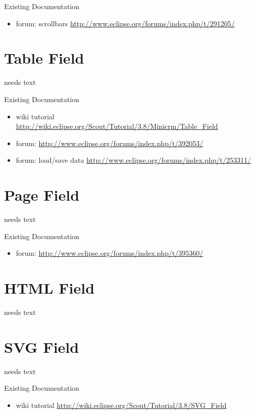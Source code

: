 \documentclass[a4paper,10pt,twoside]{book}
\begin{document}
\noindent Existing Documentation
\begin{itemize}
  \item forum: scrollbars \url{http://www.eclipse.org/forums/index.php/t/291205/}
\end{itemize}


\section{Table Field}
needs text

\noindent Existing Documentation
\begin{itemize}
  \item wiki tutorial \url{http://wiki.eclipse.org/Scout/Tutorial/3.8/Minicrm/Table_Field}
  \item forum: \url{http://www.eclipse.org/forums/index.php/t/392053/}
  \item forum: load/save data \url{http://www.eclipse.org/forums/index.php/t/253311/}
\end{itemize}

\section{Page Field}
needs text

\noindent Existing Documentation
\begin{itemize}
  \item forum: \url{http://www.eclipse.org/forums/index.php/t/395360/}
\end{itemize}

\section{HTML Field}
needs text

\section{SVG Field}
needs text

\noindent Existing Documentation
\begin{itemize}
  \item wiki tutorial \url{http://wiki.eclipse.org/Scout/Tutorial/3.8/SVG_Field}
\end{itemize}
\end{document}
